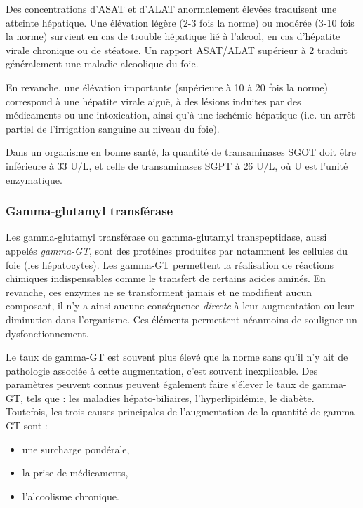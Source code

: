 \documentclass[12pt]{article}
\begin{document}
	Des concentrations d'ASAT et d'ALAT anormalement élevées traduisent une atteinte hépatique. Une élévation légère (2-3 fois la norme) ou modérée (3-10 fois la norme) survient en cas de trouble hépatique lié à l'alcool, en cas d'hépatite virale chronique ou de stéatose. Un rapport ASAT/ALAT supérieur à 2 traduit généralement une maladie alcoolique du foie. 
	
	En revanche, une élévation importante (supérieure à 10 à 20 fois la norme) correspond à une hépatite virale aiguë, à des lésions induites par des médicaments ou une intoxication, ainsi qu'à une ischémie hépatique (i.e. un arrêt partiel de l'irrigation sanguine au niveau du foie).
	
	Dans un organisme en bonne santé, la quantité de transaminases SGOT doit être inférieure à $33$ U$/$L, et celle de transaminases SGPT à $26$ U$/$L, où U est l'unité enzymatique.
	
	\subsubsection{Gamma-glutamyl transférase}
	Les gamma-glutamyl transférase ou gamma-glutamyl transpeptidase, aussi appelés \textit{gamma-GT}, sont des protéines produites par notamment les cellules du foie (les hépatocytes). Les gamma-GT permettent la réalisation de réactions chimiques indispensables comme le transfert de certains acides aminés. En revanche, ces enzymes ne se transforment jamais et ne modifient aucun composant, il n'y a ainsi aucune conséquence \textit{directe} à leur augmentation ou leur diminution dans l'organisme. Ces éléments permettent néanmoins de souligner un dysfonctionnement.
	
	Le taux de gamma-GT est souvent plus élevé que la norme sans qu'il n'y ait de pathologie associée à cette augmentation, c'est souvent inexplicable. Des paramètres peuvent connus peuvent également faire s'élever le taux de gamma-GT, tels que : les maladies hépato-biliaires, l'hyperlipidémie, le diabète. Toutefois, les trois causes principales de l'augmentation de la quantité de gamma-GT sont :
	\begin{itemize}
	\item une surcharge pondérale,
	\item la prise de médicaments,
	\item l'alcoolisme chronique.
	\end{itemize}
	
\end{document}
